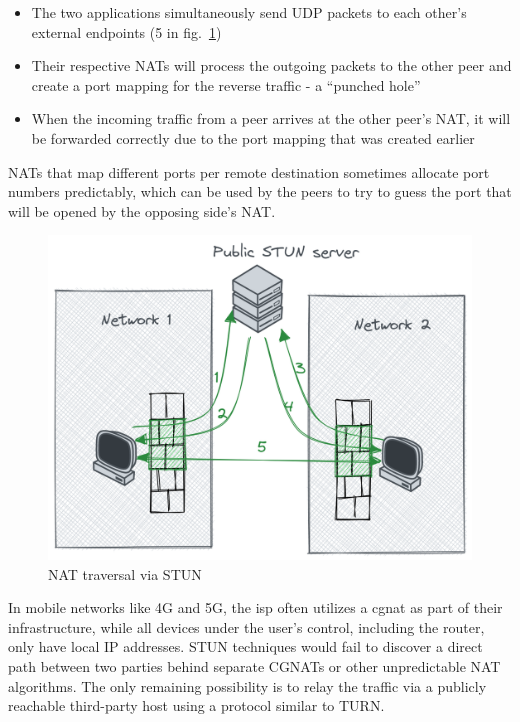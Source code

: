 \begin{itemize}
\tightlist
\item
  The two applications simultaneously send UDP packets to each other's external endpoints (5 in fig.~\ref{nat-traversal})
\item
  Their respective NATs will process the outgoing packets to the other peer and create a port mapping for the reverse traffic - a ``punched hole''
\item
  When the incoming traffic from a peer arrives at the other peer's NAT, it will be forwarded correctly due to the port mapping that was created earlier
\end{itemize}

NATs that map different ports per remote destination sometimes allocate port numbers predictably, which can be used by the peers to try to guess the port that will be opened by the opposing side's NAT.


\begin{figure}
\centering
\includegraphics[width=\textwidth,height=0.25\textheight]{thesis/../figures/nat-traversal.png}
\caption{NAT traversal via STUN\label{nat-traversal}}
\end{figure}

In mobile networks like 4G and 5G, the \gls{isp} often utilizes a \gls{cgnat} as part of their infrastructure, while all devices under the user's control, including the router, only have local IP addresses. STUN techniques would fail to discover a direct path between two parties behind separate CGNATs or other unpredictable NAT algorithms. The only remaining possibility is to relay the traffic via a publicly reachable third-party host using a protocol similar to TURN. 

